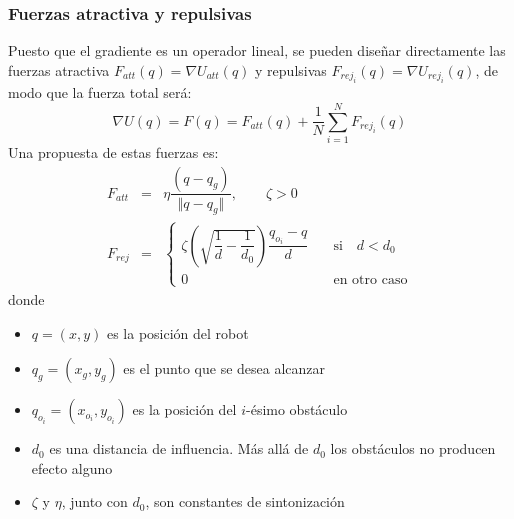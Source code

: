 \begin{frame}\frametitle{Fuerzas atractiva y repulsivas}
  Puesto que el gradiente es un operador lineal, se pueden diseñar directamente las fuerzas atractiva $F_{att}(q) = \nabla U_{att}(q)$ y repulsivas $F_{rej_i}(q) = \nabla U_{rej_i}(q)$, de modo que la fuerza total será:
  \[ \nabla U(q) = F(q) = F_{att}(q) + \frac{1}{N}\sum_{i=1}^N F_{rej_i}(q)\]
  Una propuesta de estas fuerzas es:
  \begin{eqnarray*}
    \label{eq:attractive}
    F_{att} &=& \eta \dfrac{\left(q - q_g\right) }{\Vert q - q_g \Vert},\qquad \zeta > 0\label{eq:PotFieldsAttraction}\\
    F_{rej} &=& \begin{cases}
                  \zeta\left(\sqrt{\dfrac{1}{d} - \dfrac{1}{d_0}}\right)\dfrac{q_{o_i} - q}{d}
                  & \quad\textrm{si}\quad d < d_0\\
                  0 & \quad\textrm{en otro caso}
                \end{cases}
  \end{eqnarray*}
  donde
  \begin{itemize}
  \item $q=(x,y)$ es la posición del robot
  \item $q_g=(x_g, y_g)$ es el punto que se desea alcanzar
  \item $q_{o_i} = (x_{o_i}, y_{o_i})$ es la posición del $i$-ésimo obstáculo
  \item $d_0$ es una distancia de influencia. Más allá de $d_0$ los obstáculos no producen efecto alguno
  \item $\zeta$ y $\eta$, junto con $d_0$, son constantes de sintonización
  \end{itemize}
\end{frame}

